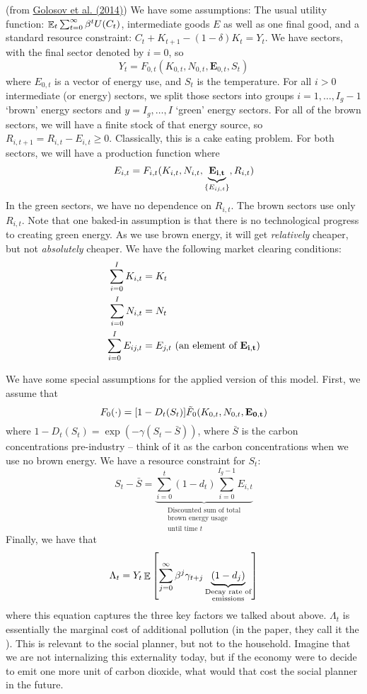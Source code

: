 \documentclass[10pt]{article}
\begin{document}
\begin{model}
	 (from \href{http://hassler-j.iies.su.se/PAPERS/ecta.pdf}{Golosov et al. (2014)}) We have some assumptions: The usual utility function: $\mathop{\mathbb{E}}_t \sum_{t=0}^\infty \beta^t U(C_t)$, intermediate goods $E$ as well as one final good, and a standard resource constraint: $C_t + K_{t+1} - (1-\delta)K_t = Y_t$. We have sectors, with the final sector denoted by $i = 0$, so
		\[
		Y_t = F_{0,t}(K_{0,t},N_{0,t},\textbf{E}_{0,t},S_t)
		\]
		where $E_{0,t}$ is a vector of energy use, and $S_t$ is the temperature. For all $i > 0$ intermediate (or energy) sectors, we split those sectors into groups $i = 1,\dots,I_g - 1$ `brown' energy sectors and $y = I_g,\dots,I$ `green' energy sectors. For all of the brown sectors, we will have a finite stock of that energy source, so $R_{i,t+1} = R_{i,t} - E_{i,t} \ge 0$. Classically, this is a cake eating problem. For both sectors, we will have a production function where 
		\[
		E_{i,t} = F_{i,t}(K_{i,t},N_{i,t}, \underbrace{\bf{E}_{i,t}}_{\{E_{ij,t}\}}, R_{i,t})
		\] 
		In the green sectors, we have no dependence on $R_{i,t}$. The brown sectors use only $R_{i,t}$. Note that one baked-in assumption is that there is no technological progress to creating green energy. As we use brown energy, it will get \emph{relatively} cheaper, but not \emph{absolutely} cheaper. We have the following market clearing conditions:
		\begin{align*}
			\sum_{i=0}^I K_{i,t} &= K_t \\
			\sum_{i=0}^I N_{i,t} &= N_t \\
			\sum_{i=0}^I E_{ij,t} &= E_{j,t} \text{ (an element of } \bf{E}_{i,t})
		\end{align*}
		
		We have some special assumptions for the applied version of this model. First, we assume that 
		\[
		F_0(\cdot) = [1 - D_t(S_t)]\tilde{F}_0 (K_{0,t},N_{0,t},\bf{E}_{0,t})
		\]
		where $1 - D_t(S_t) = \exp(-\gamma (S_t - \bar{S}))$, where $\bar{S}$ is the carbon concentrations pre-industry -- think of it as the carbon concentrations when we use no brown energy. We have a resource constraint for $S_t$:
		\[
		S_t - \bar{S} = \underbrace{\sum_{i=0}^t (1 - d_t) \sum_{i=0}^{I_g - 1}  E_{i,t}}_{\substack{ \text{Discounted sum of total} \\\text{brown energy usage} \\ \text{until time } t}}
		\]
		Finally, we have that
		\[
		\Lambda_t = Y_t \mathop{\mathbb{E}}\left[ \sum_{j=0}^\infty \beta^j \gamma_{t+j}\underbrace{(1 - d_j)}_{\substack{\text{Decay rate of} \\ \text{emissions}}} \right]
		\]
		where this equation captures the three key factors we talked about above. $\Lambda_t$ is essentially the marginal cost of additional pollution (in the paper, they call it the ). This is relevant to the social planner, but not to the household. Imagine that we are not internalizing this externality today, but if the economy were to decide to emit one more unit of carbon dioxide, what would that cost the social planner in the future.
\end{model}
\end{document}
